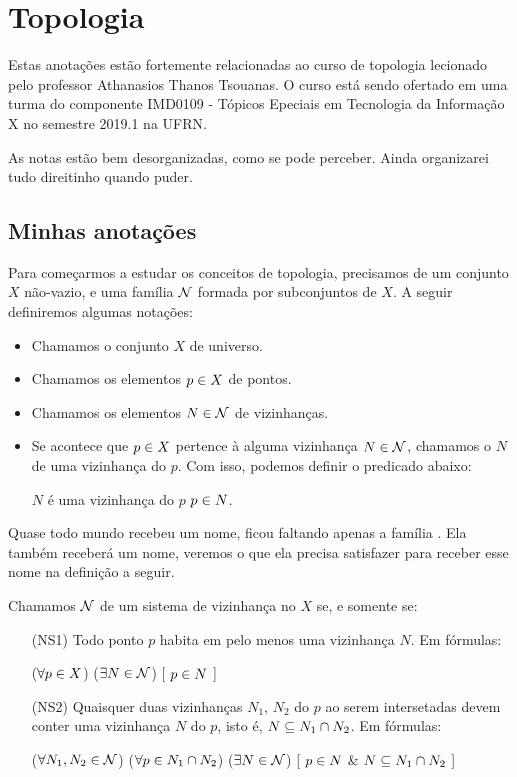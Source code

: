 \chapter{Topologia}
Estas anotações estão fortemente relacionadas ao curso de topologia lecionado pelo professor Athanasios Thanos Tsouanas. O curso está sendo ofertado em uma turma do componente IMD0109 - Tópicos Epeciais em Tecnologia da Informação X no semestre 2019.1 na UFRN.

As notas estão bem desorganizadas, como se pode perceber. Ainda organizarei tudo direitinho quando puder.

\section{Minhas anotações}
Para começarmos a estudar os conceitos de topologia, precisamos de um conjunto $X$ não-vazio, e uma família $\mathcal{N}$ formada por subconjuntos de $X$. A seguir definiremos algumas notações:
\begin{itemize}
	\item Chamamos o conjunto $X$ de universo.
	\item Chamamos os elementos $p \in X$ de pontos.
	\item Chamamos os elementos $N \in \mathcal{N}$ de vizinhanças.
	\item Se acontece que $p \in X$ pertence à alguma vizinhança $N \in \mathcal{N}$, chamamos o $N$ de uma vizinhança do $p$. Com isso, podemos definir o predicado abaixo:
	\begin{center}
		$N$ é uma vizinhança do $p$ \sse $p \in N$.
	\end{center}
\end{itemize}

Quase todo mundo recebeu um nome, ficou faltando apenas a família . Ela também receberá um nome, veremos o que ela precisa satisfazer para receber esse nome na definição a seguir.

\begin{definition}
\label{def:sistema-de-vizinhanca}
Chamamos $\mathcal{N}$ de um sistema de vizinhança no $X$ se, e somente se:
\begin{itemize}
\item[(NS1)]
\label{def:sistema-de-vizinhanca1}
	Todo ponto $p$ habita em pelo menos uma vizinhança $N$. Em fórmulas:
	\begin{center}
		($\forall p \in X$)%
		($\exists N \in \mathcal{N}$)%
		[ $p \in N$ ]
	\end{center}

\item[(NS2)]
\label{def:sistema-de-vizinhanca2}
	Quaisquer duas vizinhanças $N_1$, $N_2$ do $p$ ao serem intersetadas devem conter uma vizinhança $N$ do $p$, isto é, $N \subseteq N_1 \cap N_2$. Em fórmulas:
	\begin{center}
		($\forall N_1, N_2 \in \mathcal{N}$)%
		($\forall p \in N_1 \cap N_2$)%
		($\exists N \in \mathcal{N}$)%
		[ $p \in N$ \& $N \subseteq N_1 \cap N_2$ ]
	\end{center}
\end{itemize}
\end{definition}

